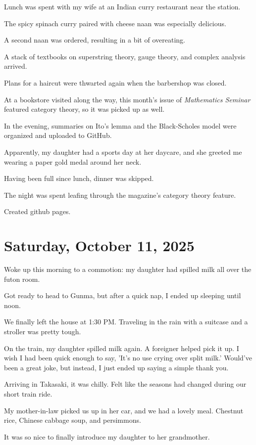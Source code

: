 \documentclass[uplatex]{jsarticle}
\begin{document}
Lunch was spent with my wife at an Indian curry restaurant near the station.

The spicy spinach curry paired with cheese naan was especially delicious.

A second naan was ordered, resulting in a bit of overeating.

A stack of textbooks on superstring theory, gauge theory, and complex analysis arrived.

Plans for a haircut were thwarted again when the barbershop was closed.

At a bookstore visited along the way, this month's issue of \textit{Mathematics Seminar} featured category theory, so it was picked up as well.

In the evening, summaries on Ito's lemma and the Black-Scholes model were organized and uploaded to GitHub.

Apparently, my daughter had a sports day at her daycare, and she greeted me wearing a paper gold medal around her neck.

Having been full since lunch, dinner was skipped.

The night was spent leafing through the magazine's category theory feature.

Created github pages.


\section{Saturday, October 11, 2025}

Woke up this morning to a commotion: my daughter had spilled milk all over the futon room.

Got ready to head to Gunma, but after a quick nap, I ended up sleeping until noon.

We finally left the house at 1:30 PM.
Traveling in the rain with a suitcase and a stroller was pretty tough.

On the train, my daughter spilled milk again.
A foreigner helped pick it up.
I wish I had been quick enough to say, 'It's no use crying over split milk.' Would've been a great joke, but instead, I just ended up saying a simple thank you.

Arriving in Takasaki, it was chilly.
Felt like the seasons had changed during our short train ride.

My mother-in-law picked us up in her car, and we had a lovely meal.
Chestnut rice, Chinese cabbage soup, and persimmons.

It was so nice to finally introduce my daughter to her grandmother.
\end{document}
